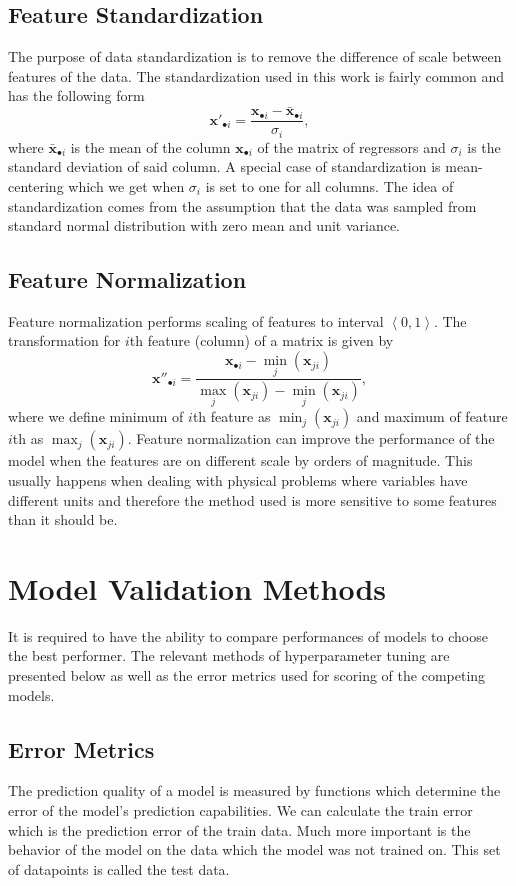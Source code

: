 \documentclass[11pt,oneside,czech,american]{book} %
\theoremstyle{definition} %
\theoremstyle{definition}
\begin{document}
\subsection{Feature Standardization}
The purpose of data standardization is to remove the difference of scale between features of the data. The standardization used in this work is fairly common and has the following form
\begin{equation}
	\bm{x'}_{\bullet i} = \frac{\bm{x}_{\bullet i} - \bm{\bar{x}}_{\bullet i}  }{\sigma_i},
	\label{standardization}
\end{equation}
where $\bm{\bar{x}}_{\bullet i}$ is the mean of the column $\bm{x}_{\bullet i}$ of the matrix of regressors and $\sigma_i$ is the standard deviation of said column.  A special case of standardization is mean-centering which we get when $\sigma_i$ is set to one for all columns. The idea of standardization comes from the assumption that the data was sampled from standard normal distribution with zero mean and unit variance.
\subsection{Feature Normalization}
Feature normalization performs scaling of features to interval $\left<0,1\right>$. The transformation for $i$th feature (column) of a matrix is given by
\begin{equation}
		\bm{x''}_{\bullet i} = \frac{\bm{x}_{\bullet i} - \min_{j}(\bm{x}_{j i}) }{\max_{j} (\bm{x}_{j i}) - \min_{j}(\bm{x}_{j i})},
		\label{normalization}
\end{equation}
where we define minimum of $i$th feature as $\min_{j} (\bm{x}_{j i})$ and maximum of feature $i$th as $\max_{j} (\bm{x}_{j i})$. Feature normalization can improve the performance of the model when the features are on different scale by orders of magnitude. This usually happens when dealing with physical problems where variables have different units and therefore the method used is more sensitive to some features than it should be.

\section{Model Validation Methods}
It is required to have the ability to compare performances of models to choose the best performer. The relevant methods of hyperparameter tuning are presented below as well as the error metrics used for scoring of the competing models.

\subsection{Error Metrics}
The prediction quality of a model is measured by functions which determine the error of the model's prediction capabilities. We can calculate the train error which is the prediction error of the train data. Much more important is the behavior of the model on the data which the model was not trained on. This set of datapoints is called the test data.
\end{document}
